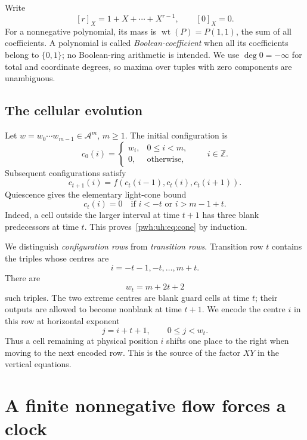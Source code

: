 \documentclass[11pt,letterpaper]{article}
\numberwithin{equation}{section}
\theoremstyle{definition}
\newcommand{\Z}{\mathbb Z}
\newcommand{\A}{\mathcal A}
\newcommand{\wt}{\operatorname{wt}}
\newcommand{\rep}[1]{[#1]_X}
\begin{document}
Write
\[
 \rep{r}=1+X+\cdots+X^{r-1},\qquad \rep{0}=0.
\]
For a nonnegative polynomial, its mass is
$\wt(P)=P(1,1)$, the sum of all coefficients. A polynomial is called
\emph{Boolean-coefficient} when all its coefficients belong to
$\{0,1\}$; no Boolean-ring arithmetic is intended. We use $\deg 0=-\infty$ for total
and coordinate degrees, so maxima over tuples with zero components are
unambiguous.

\subsection{The cellular evolution}

Let $w=w_0\cdots w_{m-1}\in\A^m$, $m\ge1$. The initial configuration is
\[
 c_0(i)=\begin{cases}w_i,&0\le i<m,\\0,&\text{otherwise},\end{cases}
 \qquad i\in\Z.
\]
Subsequent configurations satisfy
\begin{equation}
 c_{t+1}(i)=f(c_t(i-1),c_t(i),c_t(i+1)).
 \label{pwh:uh:eq:ca}
\end{equation}
Quiescence gives the elementary light-cone bound
\begin{equation}
 c_t(i)=0\quad\text{if }i<-t\text{ or }i>m-1+t.
 \label{pwh:uh:eq:cone}
\end{equation}
Indeed, a cell outside the larger interval at time $t+1$ has three blank
predecessors at time $t$. This proves~\eqref{pwh:uh:eq:cone} by induction.

We distinguish \emph{configuration rows} from \emph{transition rows}.
Transition row $t$ contains the triples whose centres are
\[
 i=-t-1,-t,\ldots,m+t.
\]
There are
\begin{equation}
 w_t=m+2t+2
 \label{pwh:uh:eq:width}
\end{equation}
such triples. The two extreme centres are blank guard cells at time $t$;
their outputs are allowed to become nonblank at time $t+1$. We encode the
centre $i$ in this row at horizontal exponent
\begin{equation}
  j=i+t+1,\qquad 0\le j<w_t.
  \label{pwh:uh:eq:shear}
\end{equation}
Thus a cell remaining at physical position $i$ shifts one place to the
right when moving to the next encoded row. This is the source of the
factor $XY$ in the vertical equations.

\section{A finite nonnegative flow forces a clock}
\label{pwh:uh:sec:clocks}
\end{document}
